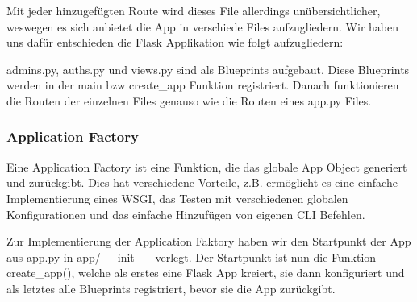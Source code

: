 \documentclass[letterpaper,10pt,ngerman]{sphinxmanual}
\begin{document}
Mit jeder hinzugefügten Route wird dieses File allerdings unübersichtlicher, weswegen es sich anbietet die App in verschiede Files aufzugliedern. Wir haben uns dafür entschieden die Flask Applikation wie folgt aufzugliedern:

\begin{sphinxVerbatim}[commandchars=\\\{\}]
                
     
       
        
           
        
        
      
         
             
\end{sphinxVerbatim}

admins.py, auths.py und views.py sind als Blueprints aufgebaut. Diese Blueprints werden in der main bzw create\_app Funktion registriert. Danach funktionieren die Routen der einzelnen Files genauso wie die Routen eines app.py Files.


\subsubsection{Application Factory}
\label{\detokenize{webapp:application-factory}}
Eine Application Factory ist eine Funktion, die das globale App Object generiert und zurückgibt. Dies hat verschiedene Vorteile, z.B. ermöglicht es eine einfache Implementierung eines WSGI, das Testen mit verschiedenen globalen Konfigurationen und das einfache Hinzufügen von eigenen CLI Befehlen.

Zur Implementierung der Application Faktory haben wir den Startpunkt der App aus app.py in app/\_\_init\_\_ verlegt. Der Startpunkt ist nun die Funktion create\_app(), welche als erstes eine Flask App kreiert, sie dann konfiguriert und als letztes alle Blueprints registriert, bevor sie die App zurückgibt.
\end{document}
